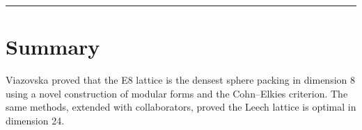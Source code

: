 \begin{center}\rule{0.5\linewidth}{0.5pt}\end{center}

\section*{Summary}

Viazovska proved that the E8 lattice is the densest sphere packing in dimension 8 using a novel construction of modular forms and the Cohn--Elkies criterion. The same methods, extended with collaborators, proved the Leech lattice is optimal in dimension 24.
